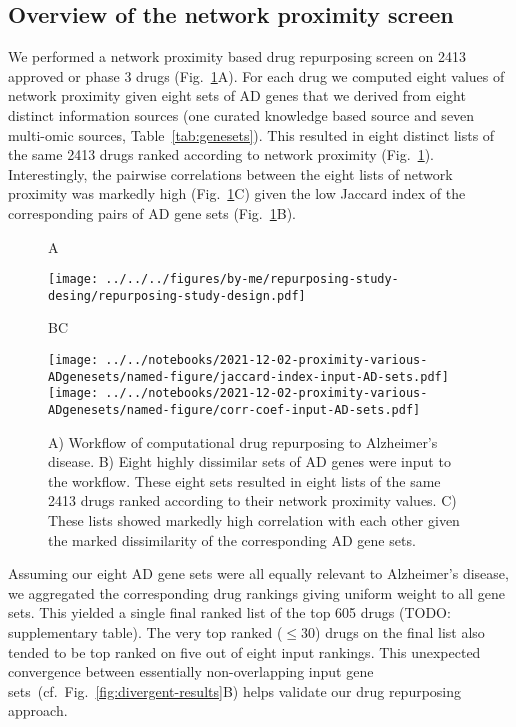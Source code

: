 \documentclass[letterpaper]{article}
\begin{document}
\subsection{Overview of the network proximity screen}

We performed a network proximity based drug repurposing screen on 2413
approved or phase 3 drugs (Fig.~\ref{fig:workflow}A).  For each drug we
computed eight values of network proximity given eight sets of AD genes that
we derived from eight distinct information sources (one curated knowledge
based source and seven multi-omic sources, Table~\ref{tab:genesets}).  This
resulted in eight distinct lists of the same 2413 drugs ranked according to
network proximity (Fig.~\ref{fig:workflow}).  Interestingly, the pairwise
correlations between the  eight lists of network proximity was markedly high
(Fig.~\ref{fig:workflow}C) given the low Jaccard index of the corresponding
pairs of AD gene sets (Fig.~\ref{fig:workflow}B).

\begin{figure}
\hspace{0.05\textwidth}A

\texttt{[image: ../../../figures/by-me/repurposing-study-desing/repurposing-study-design.pdf]}

\hspace{0.05\textwidth}B\hspace{0.5\textwidth}C

\texttt{[image: ../../notebooks/2021-12-02-proximity-various-ADgenesets/named-figure/jaccard-index-input-AD-sets.pdf]}
\texttt{[image: ../../notebooks/2021-12-02-proximity-various-ADgenesets/named-figure/corr-coef-input-AD-sets.pdf]}
\caption{
A) Workflow of computational drug repurposing to Alzheimer's disease.  B)
Eight highly dissimilar sets of AD genes were input to the workflow.  These
eight sets resulted in eight lists of the same 2413 drugs ranked according to
their network proximity values.  C) These lists showed markedly high
correlation with each other given the marked dissimilarity of the
corresponding AD gene sets.
}
\label{fig:workflow}
\end{figure}

Assuming our eight AD gene sets were all equally relevant to Alzheimer's
disease, we aggregated the corresponding drug rankings giving uniform weight
to all gene sets.  This yielded a single final ranked list of the top 605
drugs (TODO: supplementary table).  The very top ranked ($\le 30$) drugs on
the final list also tended to be top ranked on five out of eight input
rankings.  This unexpected convergence between essentially non-overlapping
input gene sets~(cf.~Fig.~\ref{fig:divergent-results}B) helps validate our drug
repurposing approach.
\end{document}
